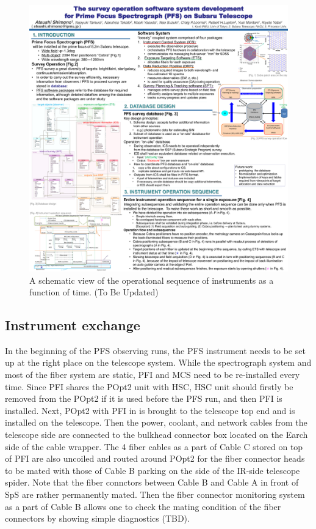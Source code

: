 \documentclass[a4paper]{article}
\begin{document}
\begin{figure}[!htb]
\begin{center}
\includegraphics[scale=0.5]{./figures/PFS_Operational_Sequence_for_Single_Exposure_SPIE2016.pdf}
\end{center}
\caption{A schematic view of the operational sequence of instruments as a function of time. (To Be Updated) \label{fig:single_exposure_sequence1}}
\end{figure}

\subsection{Instrument exchange}
In the beginning of the PFS observing runs, the PFS instrument needs
to be set up at the right place on the telescope system. While the
spectrograph system and most of the fiber system are static, PFI and
MCS need to be re-installed every time. Since PFI shares the POpt2
unit with HSC, HSC unit should firstly be removed from the POpt2 if it
is used before the PFS run, and then PFI is installed. Next, POpt2
with PFI in is brought to the telescope top end and is installed on
the telescope. Then the power, coolant, and network cables from the
telescope side are connected to the bulkhead connector box located on
the Earch side of the cable wrapper. The 4 fiber cables as a part of
Cable C stored on top of PFI are also uncoiled and routed around POpt2
for the fiber connector heads to be mated with those of Cable B
parking on the side of the IR-side telescope spider. Note that the
fiber connctors between Cable B and Cable A in front of SpS are rather
permanently mated. Then the fiber connector monitoring system as a
part of Cable B allows one to check the mating condition of the fiber
connectors by showing simple diagnostics (TBD).
\end{document}
